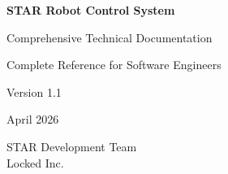 \documentclass[11pt,letterpaper]{article}
\begin{document}

\begin{titlepage}
\centering
\vspace*{2cm}

{\Huge\bfseries STAR Robot Control System\par}
\vspace{0.5cm}
{\LARGE Comprehensive Technical Documentation\par}
\vspace{1cm}
{\Large Complete Reference for Software Engineers\par}

\vfill

{\large Version 1.1\par}
{\large April 2026\par}

\vfill

{\normalsize STAR Development Team\\ Locked Inc.\par}
\end{titlepage}

\tableofcontents
\newpage



















\end{document}
